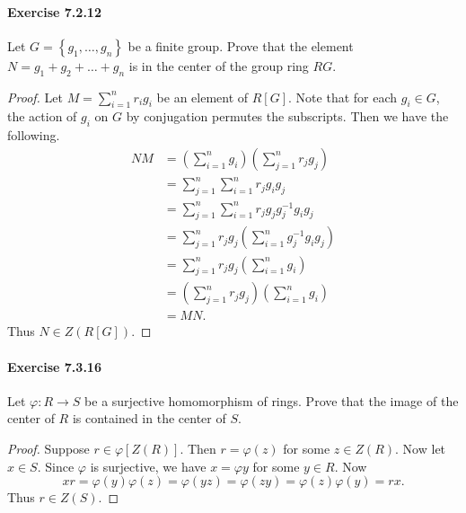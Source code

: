 \documentclass{article}
\theoremstyle{definition}
\begin{document}
\paragraph{Exercise 7.2.12} Let $G=\left\{g_{1}, \ldots, g_{n}\right\}$ be a finite group. Prove that the element $N=g_{1}+g_{2}+\ldots+g_{n}$ is in the center of the group ring $R G$.
\begin{proof}
    Let $M=\sum_{i=1}^n r_i g_i$ be an element of $R[G]$. Note that for each $g_i \in G$, the action of $g_i$ on $G$ by conjugation permutes the subscripts. Then we have the following.
$$
\begin{aligned}
N M &=\left(\sum_{i=1}^n g_i\right)\left(\sum_{j=1}^n r_j g_j\right) \\
&=\sum_{j=1}^n \sum_{i=1}^n r_j g_i g_j \\
&=\sum_{j=1}^n \sum_{i=1}^n r_j g_j g_j^{-1} g_i g_j \\
&=\sum_{j=1}^n r_j g_j\left(\sum_{i=1}^n g_j^{-1} g_i g_j\right) \\
&=\sum_{j=1}^n r_j g_j\left(\sum_{i=1}^n g_i\right) \\
&=\left(\sum_{j=1}^n r_j g_j\right)\left(\sum_{i=1}^n g_i\right) \\
&=M N .
\end{aligned}
$$
Thus $N \in Z(R[G])$.
\end{proof}



\paragraph{Exercise 7.3.16} Let $\varphi: R \rightarrow S$ be a surjective homomorphism of rings. Prove that the image of the center of $R$ is contained in the center of $S$.
\begin{proof}
    Suppose $r \in \varphi[Z(R)]$. Then $r=\varphi(z)$ for some $z \in Z(R)$. Now let $x \in S$. Since $\varphi$ is surjective, we have $x=\varphi y$ for some $y \in R$. Now
$$
x r=\varphi(y) \varphi(z)=\varphi(y z)=\varphi(z y)=\varphi(z) \varphi(y)=r x .
$$
Thus $r \in Z(S)$.
\end{proof}
\end{document}
